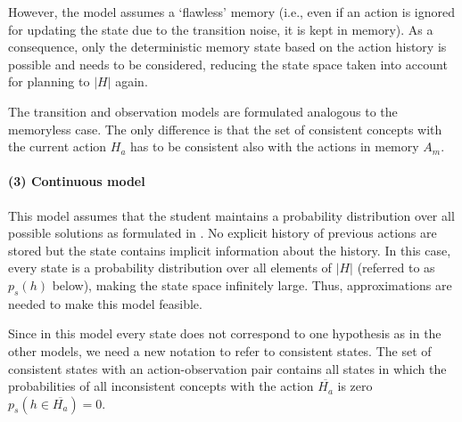 However, the model assumes a `flawless' memory (i.e., even if an action is ignored for updating the state due to the transition noise, it is kept in memory). As a consequence, only the deterministic memory state based on the action history is possible and needs to be considered, reducing the state space taken into account for planning to $|H|$ again.


The transition and observation models are formulated analogous to the memoryless case. 
The only difference is that the set of consistent concepts with the current action $H_a$ has to be consistent also with the actions in memory $A_m$.




\paragraph{(3) Continuous model}
This model assumes that the student maintains a probability distribution over all possible solutions as formulated in \cite{tenenbaum2000rules}. 
No explicit history of previous actions are stored but the state contains implicit information about the history.
In this case, every state is a probability distribution over all elements of $|H|$ (referred to as $p_s(h)$ below), making the state space infinitely large. Thus, approximations are needed to make this model feasible.

Since in this model every state does not correspond to one hypothesis as in the other models, we need a new notation to refer to consistent states.
The set of consistent states with an action-observation pair contains all states in which the probabilities of all inconsistent concepts with the action $\overline{H_a}$ is zero $p_s(h \in \overline{H_a}) = 0$.

